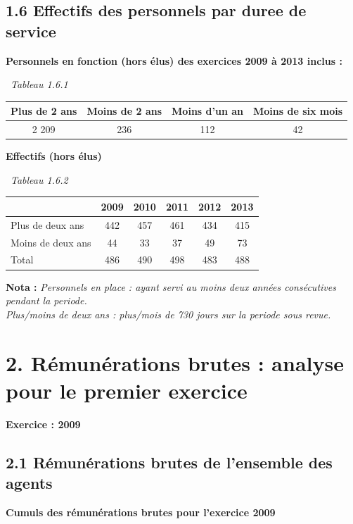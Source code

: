 \hypertarget{effectifs-des-personnels-par-duree-de-service}{%
\subsection{1.6 Effectifs des personnels par duree de
service}\label{effectifs-des-personnels-par-duree-de-service}}

\textbf{Personnels en fonction (hors élus) des exercices 2009 à 2013
inclus :}

~\emph{Tableau 1.6.1}

\begin{longtable}[]{@{}cccc@{}}
\toprule
Plus de 2 ans & Moins de 2 ans & Moins d'un an & Moins de six
mois\tabularnewline
\midrule
\endhead
2 209 & 236 & 112 & 42\tabularnewline
\bottomrule
\end{longtable}

\textbf{Effectifs (hors élus)}

~\emph{Tableau 1.6.2}

\begin{longtable}[]{@{}lccccc@{}}
\toprule
& 2009 & 2010 & 2011 & 2012 & 2013\tabularnewline
\midrule
\endhead
Plus de deux ans & 442 & 457 & 461 & 434 & 415\tabularnewline
Moins de deux ans & 44 & 33 & 37 & 49 & 73\tabularnewline
Total & 486 & 490 & 498 & 483 & 488\tabularnewline
\bottomrule
\end{longtable}

\textbf{Nota :} \emph{Personnels en place : ayant servi au moins deux
années consécutives pendant la periode.}\\
\emph{Plus/moins de deux ans : plus/mois de 730 jours sur la periode
sous revue.}

\hypertarget{remunerations-brutes-analyse-pour-le-premier-exercice}{%
\section{2. Rémunérations brutes : analyse pour le premier
exercice}\label{remunerations-brutes-analyse-pour-le-premier-exercice}}

\textbf{Exercice : 2009 }

\hypertarget{remunerations-brutes-de-lensemble-des-agents}{%
\subsection{2.1 Rémunérations brutes de l'ensemble des
agents}\label{remunerations-brutes-de-lensemble-des-agents}}

\textbf{Cumuls des rémunérations brutes pour l'exercice 2009 }

